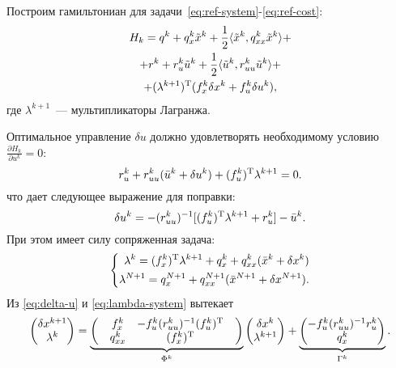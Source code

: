 \documentclass[../../doc.tex]{subfiles}
\begin{document}
    Построим гамильтониан для задачи~\eqref{eq:ref-system}-\eqref{eq:ref-cost}:
    \begin{multline}\label{eq:hamiltonian}
        H_k = q^{k} + q_x^{k}\tilde x^{k} + \frac{1}{2}\langle \tilde x^{k}, q_{xx}^{k}\tilde x^{k} \rangle
        +\\+
        r^{k} + r_u^{k}\tilde u^{k} + \frac{1}{2}\langle \tilde u^{k}, r_{uu}^{k}\tilde u^{k} \rangle
        +\\+
        (\lambda^{k+1})^\textnormal{T} (f_x^k \delta x^k + f_u^k \delta u^k),
    \end{multline}
    где $\lambda^{k+1}$~--- мультипликаторы Лагранжа.

    Оптимальное управление $\delta u$ должно удовлетворять необходимому условию $\frac{\partial H_k}{\partial u^k} = 0$:
    \begin{equation*}
        r_u^k + r_{uu}^k(\bar u^k + \delta u^k) + (f_u^k)^\textnormal{T}\lambda^{k+1} = 0.
    \end{equation*}
    что дает следующее выражение для поправки:
    \begin{equation}\label{eq:delta-u}
        \delta u^k = - (r_{uu}^k)^{-1}[(f_u^k)^\textnormal{T}\lambda^{k+1} + r_u^k] - \bar u^k.
    \end{equation}
    При этом имеет силу сопряженная задача:
    \begin{equation}\label{eq:lambda-system}
        \left\{\begin{aligned}
            \lambda^k = (f_x^k)^\textnormal{T} \lambda^{k+1} + q_x^k + q_{xx}^k(\bar x^k + \delta x^k)
            \\
            \lambda^{N+1} = q_x^{N+1} + q_{xx}^{N+1}(\bar x^{N+1} + \delta x^{N+1})
            .
        \end{aligned}\right.
    \end{equation}
    Из \eqref{eq:delta-u} и \eqref{eq:lambda-system} вытекает
    \begin{equation}\label{eq:delta-x-lambda-system}
        \begin{pmatrix}
            \delta x^{k+1}
            \\
            \lambda^{k}
        \end{pmatrix}
        =
        \underbrace{\begin{pmatrix}
            & f_x^k & -f^k_u (r^k_{uu})^{-1} (f^k_u)^\textnormal{T} &
            \\
            & q^k_{xx} & (f^k_x)^\textnormal{T} &
        \end{pmatrix}}_{\Phi^k}
        \begin{pmatrix}
            \delta x^k
            \\
            \lambda^{k+1}
        \end{pmatrix}
        +
        \underbrace{\begin{pmatrix}
            -f^k_u (r^k_{uu})^{-1} r^k_u
            \\
            q^k_x
        \end{pmatrix}}_{\Gamma^k}.
    \end{equation}
\end{document}
